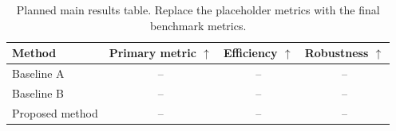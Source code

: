 \begin{table}[t]
\caption{Planned main results table. Replace the placeholder metrics with the final benchmark metrics.}
\label{tab:main-results-plan}
\begin{center}
\begin{tabular}{lccc}
\toprule
Method & Primary metric $\uparrow$ & Efficiency $\uparrow$ & Robustness $\uparrow$ \\
\midrule
Baseline A & -- & -- & -- \\
Baseline B & -- & -- & -- \\
Proposed method & -- & -- & -- \\
\bottomrule
\end{tabular}
\end{center}
\end{table}
